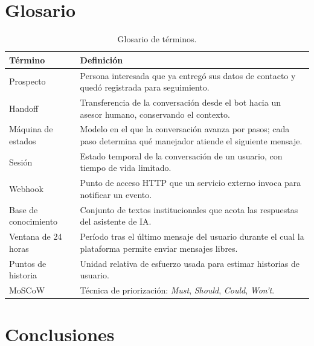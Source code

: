 \documentclass[12pt,a4paper]{report}
\newcommand{\tablacompacta}{\setstretch{1.1}\small}
\newcommand{\cabecera}[1]{\rowcolor{filacabecera}#1}
\begin{document}
\section{Glosario}

\begin{table}[H]
    \centering
    \tablacompacta
    \begin{tabularx}{\textwidth}{p{3.6cm}X}
        \toprule
        \cabecera{\textbf{Término}} & \textbf{Definición} \\
        \midrule
        Prospecto & Persona interesada que ya entregó sus datos de contacto y quedó registrada para seguimiento. \\
        Handoff & Transferencia de la conversación desde el bot hacia un asesor humano, conservando el contexto. \\
        Máquina de estados & Modelo en el que la conversación avanza por pasos; cada paso determina qué manejador atiende el siguiente mensaje. \\
        Sesión & Estado temporal de la conversación de un usuario, con tiempo de vida limitado. \\
        Webhook & Punto de acceso HTTP que un servicio externo invoca para notificar un evento. \\
        Base de conocimiento & Conjunto de textos institucionales que acota las respuestas del asistente de IA. \\
        Ventana de 24 horas & Período tras el último mensaje del usuario durante el cual la plataforma permite enviar mensajes libres. \\
        Puntos de historia & Unidad relativa de esfuerzo usada para estimar historias de usuario. \\
        MoSCoW & Técnica de priorización: \textit{Must}, \textit{Should}, \textit{Could}, \textit{Won't}. \\
        \bottomrule
    \end{tabularx}
    \caption{Glosario de términos.}
\end{table}

\section{Conclusiones}
\end{document}
